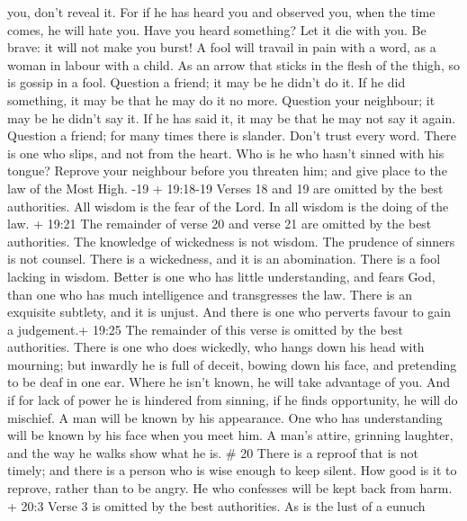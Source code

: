 you, don't reveal it.  For if he has heard you and observed
you, when the time comes, he will hate you.  Have you heard
something? Let it die with you. Be brave: it will not make you burst!
 A fool will travail in pain with a word, as a woman in
labour with a child.  As an arrow that sticks in the flesh
of the thigh, so is gossip in a fool.  Question a friend;
it may be he didn't do it. If he did something, it may be that he may do
it no more.  Question your neighbour; it may be he didn't
say it. If he has said it, it may be that he may not say it again.
 Question a friend; for many times there is slander. Don't
trust every word.  There is one who slips, and not from the
heart. Who is he who hasn't sinned with his tongue? 
Reprove your neighbour before you threaten him; and give place to the
law of the Most High. -19 + 19:18-19 Verses 18 and 19 are
omitted by the best authorities.  All wisdom is the fear of
the Lord. In all wisdom is the doing of the law.  + 19:21
The remainder of verse 20 and verse 21 are omitted by the best
authorities.  The knowledge of wickedness is not wisdom.
The prudence of sinners is not counsel.  There is a
wickedness, and it is an abomination. There is a fool lacking in wisdom.
 Better is one who has little understanding, and fears God,
than one who has much intelligence and transgresses the law.
 There is an exquisite subtlety, and it is unjust. And
there is one who perverts favour to gain a judgement.+ 19:25 The
remainder of this verse is omitted by the best authorities.
 There is one who does wickedly, who hangs down his head
with mourning; but inwardly he is full of deceit,  bowing
down his face, and pretending to be deaf in one ear. Where he isn't
known, he will take advantage of you.  And if for lack of
power he is hindered from sinning, if he finds opportunity, he will do
mischief.  A man will be known by his appearance. One who
has understanding will be known by his face when you meet him.
 A man's attire, grinning laughter, and the way he walks
show what he is. \# 20  There is a reproof that is not
timely; and there is a person who is wise enough to keep silent.
 How good is it to reprove, rather than to be angry. He who
confesses will be kept back from harm.  + 20:3 Verse 3 is
omitted by the best authorities.  As is the lust of a eunuch
